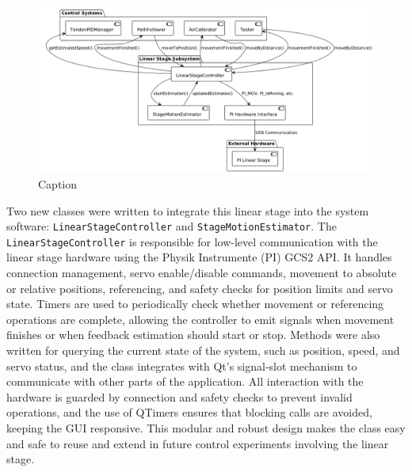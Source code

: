 \begin{figure}[H]
    \centering
    \includegraphics[width=\linewidth]{images/linearstage/architecture.png}
    \caption{Caption}
    \label{fig:enter-label}
\end{figure}

Two new classes were written to integrate this linear stage into the system software: \texttt{LinearStageController} and \texttt{StageMotionEstimator}. The \texttt{LinearStageController} is responsible for low-level communication with the linear stage hardware using the Physik Instrumente (PI) GCS2 API. It handles connection management, servo enable/disable commands, movement to absolute or relative positions, referencing, and safety checks for position limits and servo state. Timers are used to periodically check whether movement or referencing operations are complete, allowing the controller to emit signals when movement finishes or when feedback estimation should start or stop.
\newline \newline
Methods were also written for querying the current state of the system, such as position, speed, and servo status, and the class integrates with Qt’s signal-slot mechanism to communicate with other parts of the application. All interaction with the hardware is guarded by connection and safety checks to prevent invalid operations, and the use of QTimers ensures that blocking calls are avoided, keeping the GUI responsive. This modular and robust design makes the class easy and safe to  reuse and extend in future control experiments involving the linear stage.





